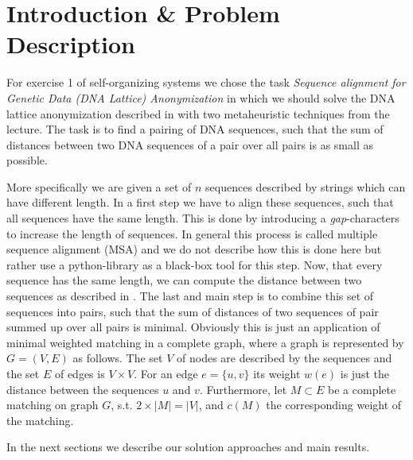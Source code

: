 \documentclass[12pt]{article}
\begin{document}
\maketitle

\section{Introduction \& Problem Description}
For exercise 1 of self-organizing systems we chose the task \textit{Sequence alignment for Genetic Data (DNA Lattice) Anonymization} in which we should solve the DNA lattice anonymization described in \cite{mainpaper} with two metaheuristic techniques from the lecture.
The task is to find a pairing of DNA sequences, such that the sum of distances between two DNA sequences of a pair over all pairs is as small as possible.

More specifically we are given a set of $n$ sequences described by strings which can have different length.
In a first step we have to align these sequences, such that all sequences have the same length.
This is done by introducing a \textit{gap}-characters to increase the length of sequences.
In general this process is called multiple sequence alignment (MSA) and we do not describe how this is done here but rather use a python-library as a black-box tool for this step.
Now, that every sequence has the same length, we can compute the distance between two sequences as described in \cite{mainpaper}.
The last and main step is to combine this set of sequences into pairs, such that the sum of distances of two sequences of pair summed up over all pairs is minimal.
Obviously this is just an application of minimal weighted matching in a complete graph, where a graph is represented by $G=(V,E)$ as follows.
The set $V$ of nodes are described by the sequences and the set $E$ of edges is $V\times V$.
For an edge $e=\{u,v\}$ its weight $w(e)$ is just the distance between the sequences $u$ and $v$. Furthermore, let $M \subset E$ be a complete matching on graph $G$, s.t. $2 \times |M| = |V|$, and $c(M)$ the corresponding weight of the matching.

In the next sections we describe our solution approaches and main results.
\end{document}

